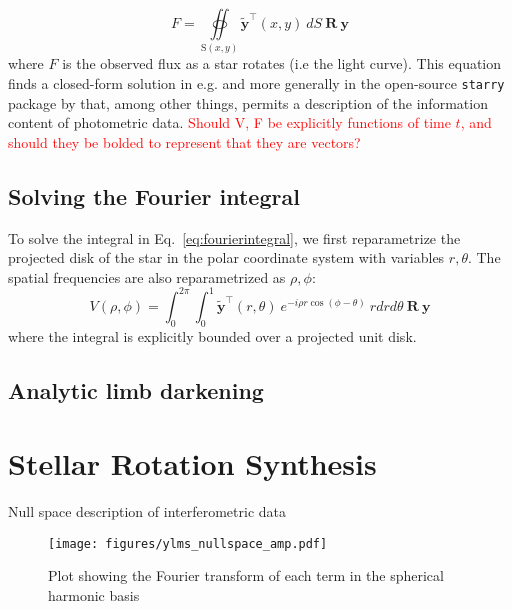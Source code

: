 \documentclass[modern]{aastex631}
\begin{document}
\begin{equation} \label{eq:fluxintegral}
   F = \oiint\limits_{\mathrm{S}(x,y)} \mathbf{\tilde{y}}^\top(x,y) \ dS \ \mathbf{R} \ \mathbf{y}
\end{equation}
where $F$ is the observed flux as a star rotates (i.e the light curve). This equation finds a closed-form solution in e.g. \citep{cowan2013} and more generally in the open-source \texttt{starry} package by \citep{starry2019} that, among other things, permits a description of the information content of photometric data.
\textcolor{red}{Should V, F be explicitly functions of time $t$, and should they be bolded to represent that they are vectors?}
\subsection{Solving the Fourier integral}

To solve the integral in Eq.~\ref{eq:fourierintegral}, we first reparametrize the projected disk of the star in the polar coordinate system with variables $r, \theta$. The spatial frequencies are also reparametrized as $\rho, \phi$:
\begin{equation} \label{eq:polarform}
   V(\rho,\phi) = \int_{0}^{2\pi}\int_{0}^{1} \mathbf{\tilde{y}}^\top(r, \theta) \ e^{-i\rho r\cos{(\phi-\theta)}} \ r dr d\theta \ \mathbf{R} \ \mathbf{y}
\end{equation} 
where the integral is explicitly bounded over a projected unit disk. 


\subsection{Analytic limb darkening}

\section{Stellar Rotation Synthesis}
\label{sec:rotsynthesis}
Null space description of interferometric data

\begin{figure}[ht!]
    \begin{centering}
        \texttt{[image: figures/ylms\_nullspace\_amp.pdf]}
        \caption{
            Plot showing the Fourier transform of each term in the spherical harmonic basis
        }
        \label{fig:pyramid}
    \end{centering}
\end{figure}
\end{document}
